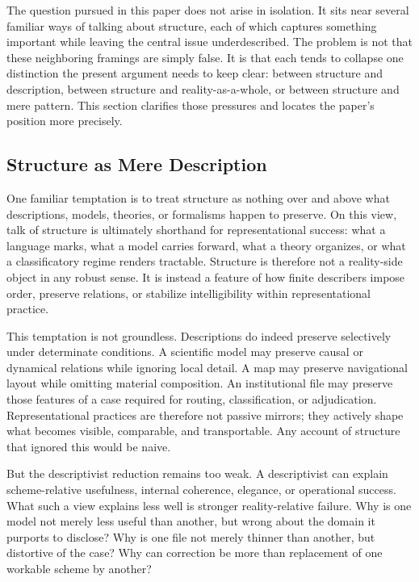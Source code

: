 \documentclass[11pt]{article}
\begin{document}
The question pursued in this paper does not arise in isolation. It sits near several familiar ways of talking about structure, each of which captures something important while leaving the central issue underdescribed. The problem is not that these neighboring framings are simply false. It is that each tends to collapse one distinction the present argument needs to keep clear: between structure and description, between structure and reality-as-a-whole, or between structure and mere pattern. This section clarifies those pressures and locates the paper's position more precisely.

\subsection{Structure as Mere Description}

One familiar temptation is to treat structure as nothing over and above what descriptions, models, theories, or formalisms happen to preserve. On this view, talk of structure is ultimately shorthand for representational success: what a language marks, what a model carries forward, what a theory organizes, or what a classificatory regime renders tractable. Structure is therefore not a reality-side object in any robust sense. It is instead a feature of how finite describers impose order, preserve relations, or stabilize intelligibility within representational practice. \cite{FriggNguyen2021ScientificRepresentationSEP,FriggHartmann2025ModelsScienceSEP}

This temptation is not groundless. Descriptions do indeed preserve selectively under determinate conditions. A scientific model may preserve causal or dynamical relations while ignoring local detail. A map may preserve navigational layout while omitting material composition. An institutional file may preserve those features of a case required for routing, classification, or adjudication. Representational practices are therefore not passive mirrors; they actively shape what becomes visible, comparable, and transportable. Any account of structure that ignored this would be naive. \cite{FriggNguyen2021ScientificRepresentationSEP,BowkerStar1999SortingThingsOut}

But the descriptivist reduction remains too weak. A descriptivist can explain scheme-relative usefulness, internal coherence, elegance, or operational success. What such a view explains less well is stronger reality-relative failure. Why is one model not merely less useful than another, but wrong about the domain it purports to disclose? Why is one file not merely thinner than another, but distortive of the case? Why can correction be more than replacement of one workable scheme by another? \cite{Chakravartty2011ScientificRealismSEP}
\end{document}

